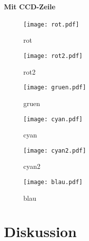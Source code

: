 \paragraph{Mit CCD-Zeile}

\begin{figure}[htbp]
    \centering
    \texttt{[image: rot.pdf]}
    \caption{%
        rot
    }
    \label{fig:}
\end{figure}

\begin{figure}[htbp]
    \centering
    \texttt{[image: rot2.pdf]}
    \caption{%
        rot2
    }
    \label{fig:}
\end{figure}

\begin{figure}[htbp]
    \centering
    \texttt{[image: gruen.pdf]}
    \caption{%
        gruen
    }
    \label{fig:}
\end{figure}

\begin{figure}[htbp]
    \centering
    \texttt{[image: cyan.pdf]}
    \caption{%
        cyan
    }
    \label{fig:}
\end{figure}

\begin{figure}[htbp]
    \centering
    \texttt{[image: cyan2.pdf]}
    \caption{%
        cyan2
    }
    \label{fig:}
\end{figure}

\begin{figure}[htbp]
    \centering
    \texttt{[image: blau.pdf]}
    \caption{%
        blau
    }
    \label{fig:}
\end{figure}


\FloatBarrier
\section{Diskussion}


